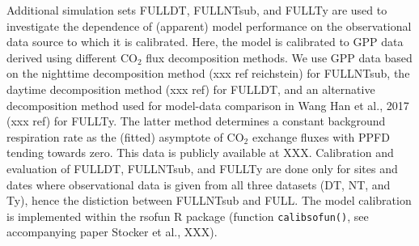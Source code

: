 \documentclass{myreport}
\begin{document}
Additional simulation sets FULL\textunderscore DT, FULL\textunderscore NTsub, and FULL\textunderscore Ty are used to investigate the dependence of (apparent) model performance on the observational data source to which it is calibrated. Here, the model is calibrated to GPP data derived using different CO$_2$ flux decomposition methods. We use GPP data based on the nighttime decomposition method (xxx ref reichstein) for FULL\textunderscore NTsub, the daytime decomposition method (xxx ref) for FULL\textunderscore DT, and an alternative decomposition method used for model-data comparison in Wang Han et al., 2017 (xxx ref) for FULL\textunderscore Ty. The latter method determines a constant background respiration rate as the (fitted) asymptote of CO$_2$ exchange fluxes with PPFD tending towards zero. This data is publicly available at XXX. Calibration and evaluation of FULL\textunderscore DT, FULL\textunderscore NTsub, and FULL\textunderscore Ty are done only for sites and dates where observational data is given from all three datasets (DT, NT, and Ty), hence the distiction between FULL\textunderscore NTsub and FULL. The model calibration is implemented within the rsofun R package (function \texttt{calib\textunderscore sofun()}, see accompanying paper Stocker et al., XXX).
\end{document}

